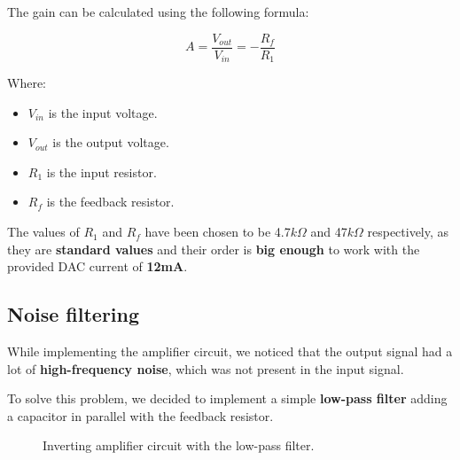 \begin{samepage}
    The gain can be calculated using the following formula:
    \nopagebreak

    \begin{equation*}
        A = \frac{V_{out}}{V_{in}} = -\frac{R_f}{R_1}
    \end{equation*}
    \nopagebreak

    Where:
    \nopagebreak

    \begin{itemize}
        \item $V_{in}$ is the input voltage.
        \item $V_{out}$ is the output voltage.
        \item $R_1$ is the input resistor.
        \item $R_f$ is the feedback resistor.
    \end{itemize}
\end{samepage}

The values of $R_1$ and $R_f$ have been chosen to be 4.7$k\Omega$ and 47$k\Omega$ respectively, as they are \textbf{standard values} and their order is \textbf{big enough} to work with the provided DAC current of \textbf{12mA}.

\subsection{Noise filtering}
While implementing the amplifier circuit, we noticed that the output signal had a lot of \textbf{high-frequency noise}, which was not present in the input signal.

\begin{samepage}
    To solve this problem, we decided to implement a simple \textbf{low-pass filter} adding a capacitor in parallel with the feedback resistor.
    \nopagebreak

    \begin{figure}[H]
        \centering
        \resizebox{.6\linewidth}{!}{
            
        }
        \caption{Inverting amplifier circuit with the low-pass filter.}
        \label{fig:non-inv_ampl_filter}
    \end{figure}
\end{samepage}


